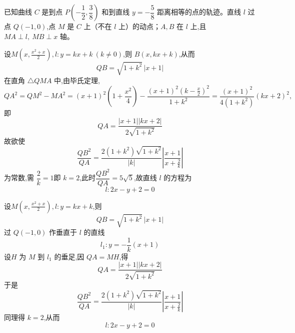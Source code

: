 \begin{questions}
    \question 已知曲线 $C$ 是到点 $P\!\left(-\dfrac12,\dfrac38\right)$ 和到直线 $y=-\dfrac58$ 距离相等的点的轨迹。直线 $l$ 过点 $Q(-1,0)$,点 $M$ 是 $C$ 上（不在 $l$ 上）的动点；$A,B$ 在 $l$ 上,且 $MA\perp l,\ MB\perp x$ 轴。
    \begin{solution}
        设$M\left(x,\frac{x^2+x}{2}\right),l: y=kx+k\ (k\neq0)$,则 $B(x,kx+k)$,从而
        \[
        QB=\sqrt{1+k^2}\,|x+1|
        \]
        在直角 $\triangle QMA$ 中,由毕氏定理,
        \[
        QA^2=QM^2-MA^2=(x+1)^2\!\left(1+\frac{x^2}{4}\right)-\frac{(x+1)^2\left(k-\frac{x}{2}\right)^2}{1+k^2}=\frac{(x+1)^2}{4(1+k^2)}(kx+2)^2,
        \]
        即
        \[
        QA=\frac{|x+1||kx+2|}{2\sqrt{1+k^2}}
        \]
        故欲使
        \[
        \frac{QB^2}{QA}
        =\frac{2(1+k^2)\sqrt{1+k^2}}{|k|}
        \left|\frac{x+1}{x+\frac{2}{k}}\right|
        \]
        为常数,需 $\dfrac{2}{k}=1$即 $k=2$,此时$\dfrac{QB^2}{QA}=5\sqrt5$,故直线 $l$ 的方程为
        \[
        l: 2x-y+2=0
        \]
    \end{solution}
    \begin{solution}
        设$M\left(x,\frac{x^2+x}{2}\right), l: y=kx+k$,则
        \[
        QB=\sqrt{1+k^2}\,|x+1|
        \]
        过 $Q(-1,0)$ 作垂直于 $l$ 的直线
        \[
        l_1: y=-\frac1k(x+1)
        \]
        设$H$ 为 $M$ 到 $l_1$ 的垂足,因 $QA=MH$,得
        \[
        QA=\frac{|x+1||kx+2|}{2\sqrt{1+k^2}}
        \]
        于是
        \[
        \frac{QB^2}{QA}
        =\frac{2(1+k^2)\sqrt{1+k^2}}{|k|}
        \left|\frac{x+1}{x+\frac{2}{k}}\right|
        \]
        同理得 $k=2$,从而
        \[
        l: 2x-y+2=0
        \]
    \end{solution}


\end{questions}
